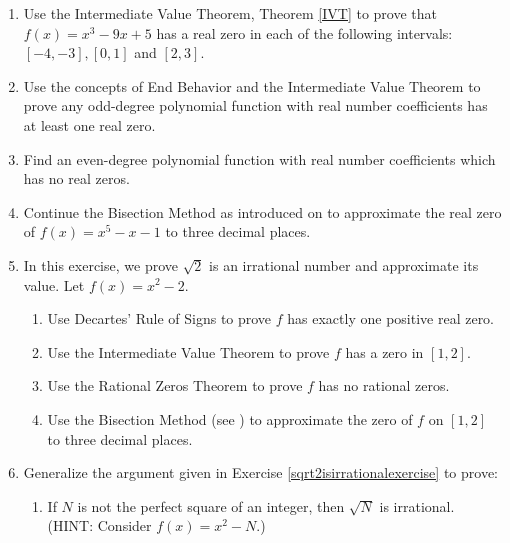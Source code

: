 \begin{enumerate}
\setcounter{enumi}{\value{HW}}

\item Use the Intermediate Value Theorem, Theorem \ref{IVT} to prove that $f(x) = x^{3} - 9x + 5$ has a real zero in each of the following intervals: $[-4, -3], [0, 1]$ and $[2, 3]$.

\item  Use the concepts of End Behavior and the Intermediate Value Theorem to prove any odd-degree polynomial function with real number coefficients has at least one real zero.

\item Find an even-degree polynomial function with real number coefficients which has no real zeros.

\item  \label{bisectionexercise} Continue  the Bisection Method as introduced on  \pageref{bisectionmethod} to approximate the real zero of $f(x) = x^5-x-1$ to three decimal places.

\item  \label{sqrt2isirrationalexercise} In this exercise, we prove $\sqrt{2}$ is an irrational number and approximate its value.  Let $f(x) = x^2-2$.

\begin{enumerate} 

\item Use Decartes' Rule of Signs to prove $f$ has exactly one positive real zero.

 \item Use the Intermediate Value Theorem to prove $f$ has a zero in $[1,2]$.

\item \label{sqrt2isirrationalexercise}  Use the Rational Zeros Theorem to prove $f$ has no rational zeros.

\item  Use the Bisection Method (see  \pageref{bisectionmethod}) to approximate the zero of $f$ on $[1,2]$ to three decimal places.

\end{enumerate}

\item  Generalize the argument given in Exercise \ref{sqrt2isirrationalexercise} to prove:

\begin{enumerate}

\item If $N$ is not the perfect square of an integer, then $\sqrt{N}$ is irrational. (HINT: Consider $f(x) = x^2-N$.)


\end{enumerate}
\end{enumerate}
